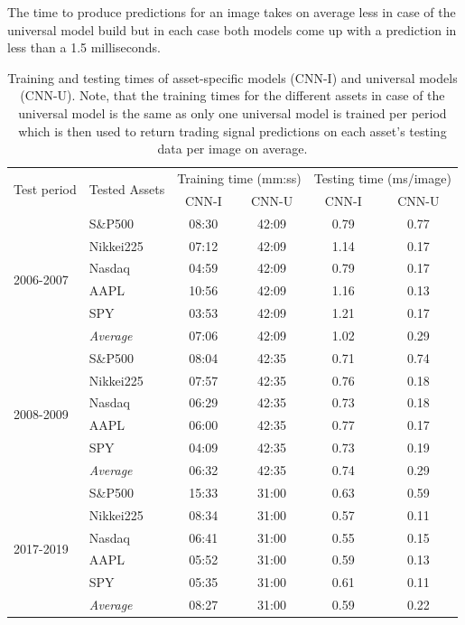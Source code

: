 \documentclass[11pt, a4paper]{article}
\begin{document}
The time to produce predictions for an image takes on average less in case of the universal model build but in each case both models come up with a prediction in less than a 1.5 milliseconds.

\begin{table}[H]
\centering
\begin{tabular}{l|l|cc|cc}
\multicolumn{1}{m{1cm}|}{\multirow{2}{1cm}{Test period}} & \multicolumn{1}{m{1.5cm}|}{\multirow{2}{1.5cm}{Tested Assets}} & \multicolumn{2}{c|}{Training time (mm:ss) } & \multicolumn{2}{c}{Testing time (ms/image)} \\ \cline{3-6}
&& CNN-I & CNN-U & CNN-I & CNN-U \\ 
\hline \hline
\multirow{6}{1cm}{2006-2007} & S\&P500   & 08:30 & 42:09 & 0.79 & 0.77 \\
          & Nikkei225 & 07:12 & 42:09 & 1.14 & 0.17 \\
          & Nasdaq    & 04:59 & 42:09 & 0.79 & 0.17 \\
          & AAPL      & 10:56 & 42:09 & 1.16 & 0.13 \\
          & SPY       & 03:53 & 42:09 & 1.21 & 0.17 \\ \cline{2-6}
          & \textit{Average}   & 07:06 & 42:09 & 1.02 & 0.29 \\ \hline
\multirow{6}{1cm}{2008-2009} & S\&P500          & 08:04 & 42:35 & 0.71 & 0.74 \\
 & Nikkei225        & 07:57 & 42:35 & 0.76 & 0.18 \\
 & Nasdaq           & 06:29 & 42:35 & 0.73 & 0.18 \\
 & AAPL             & 06:00 & 42:35 & 0.77 & 0.17 \\
 & SPY              & 04:09 & 42:35 & 0.73 & 0.19 \\ \cline{2-6} 
 & \textit{Average} & 06:32 & 42:35 & 0.74 & 0.29 \\\hline
\multirow{6}{1cm}{2017-2019} & S\&P500   & 15:33 & 31:00 & 0.63 & 0.59 \\
          & Nikkei225 & 08:34 & 31:00 & 0.57 & 0.11 \\
          & Nasdaq    & 06:41 & 31:00 & 0.55 & 0.15 \\
          & AAPL      & 05:52 & 31:00 & 0.59 & 0.13 \\
          & SPY       & 05:35 & 31:00 & 0.61 & 0.11 \\ \cline{2-6}
          & \textit{Average}   & 08:27 & 31:00 & 0.59 & 0.22
\end{tabular}
\caption{Training and testing times of asset-specific models (CNN-I) and universal models (CNN-U). Note, that the training times for the different assets in case of the universal model is the same as only one universal model is trained per period which is then used to return trading signal predictions on each asset's testing data per image on average.}
\label{tbl:TimeRes}
\end{table}
\end{document}
